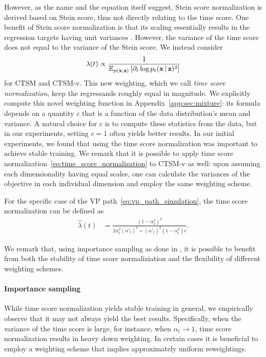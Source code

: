 However, as the name and the equation itself suggest, Stein score normalization is derived based on Stein score, thus not directly relating to the time score. One benefit of Stein score normalization is that its scaling essentially results in the regression targets having unit variances \citep{ho2020ddpm}.
However, the variance of the time score does not equal to the variance of the Stein score. We instead consider 
\begin{align}
    \label{eq:time_score_normalization}
    \lambda(t) 
    \propto \frac{1}{\mathbb{E}_{p(\operatorname{\mathbf{x}}, \operatorname{\mathbf{z}})}\left[\partial_{t}\log p_{t}(\operatorname{\mathbf{x}}|\operatorname{\mathbf{z}})^2 \right]}
\end{align}
for CTSM and CTSM-v. This new weighting, which we call \textit{time score normalization}, 
keep the regressands roughly equal in magnitude. We explicitly compute this novel weighting function in Appendix~\ref{app:sec:mixture}: its formula depends on a quantity $c$ that is a function of the data distribution's mean and variance. A natural choice for $c$ is to compute these statistics from the data, but in our experiments, setting $c=1$ often yields better results. In our initial experiments, we found that using the time score normalization was important to achieve stable training. We remark that it is possible to apply time score normalization~\eqref{eq:time_score_normalization} to CTSM-v as well: upon assuming each dimensionality having equal scales, one can calculate the variances of the objective in each individual dimension and employ the same weighting scheme.

For the specific case of the VP path~\eqref{eq:vp_path_simulation}, the time score normalization can be defined as
\begin{align}
\hat{\lambda}(t) 
&= 
\frac{\left(1-\alpha_{t}^{2}\right)^{2}}{2\alpha_{t}^{2}\left(\alpha'_{t}\right)^{2}+\left(\alpha'_{t}\right)^{2}\left(1-\alpha_{t}^{2}\right)c}.
\end{align}


We remark that, using importance sampling as done in \citet{Song2021mle}, it is possible to benefit from both the stability of time score normaliziation and the flexibility of different weighting schemes.

\paragraph{Importance sampling} 

While time score normalization yields stable training in general, we empirically observe that it may not always yield the best results. Specifically, when the variance of the time score is large, for instance, when $\alpha_{t}\rightarrow 1$, time score normalization results in heavy down weighting. In certain cases it is beneficial to employ a weighting scheme that implies approximately uniform reweightings.

